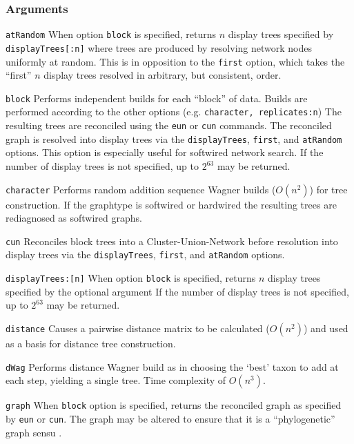 \documentclass[11pt]{article}
\begin{document}
		\subsubsection{Arguments}
		\noindent \texttt{atRandom} When option \texttt{block} is specified, returns $n$ display trees specified by \texttt{displayTrees[:n]} where trees are produced by 
		resolving network nodes uniformly at random.  This is in opposition to the \texttt{first} option, which takes the ``first'' $n$ display trees  resolved in arbitrary, but consistent, order.
		
		\smallskip
		\noindent \texttt{block} Performs independent builds for each ``block'' of data.  Builds are performed according to the other options (e.g. \texttt{character, replicates:n})
		The resulting trees are reconciled using the \texttt{eun} or \texttt{cun} commands.   The reconciled graph is resolved into display trees via the \texttt{displayTrees}, \texttt{first},
		and \texttt{atRandom} options.  This option is especially useful for softwired  network search.  If the number of display trees is not specified, up to  $2^{63}$ may be returned.
		
		\smallskip
		\noindent \texttt{character} Performs random addition sequence Wagner \citep{Farris1970} builds ($O(n^2)$) for tree construction.  If the graphtype is softwired  or hardwired
		the resulting trees are rediagnosed as softwired graphs.
		
		\smallskip
		\noindent \texttt{cun} Reconciles block trees into a  Cluster-Union-Network \citep{Baroni2005} before resolution into display trees via the \texttt{displayTrees}, \texttt{first},
		and \texttt{atRandom} options.
		
		\smallskip
		\noindent \texttt{displayTrees:[n]} When option \texttt{block} is specified, returns $n$ display trees specified by the optional argument  If the number of display trees is not specified, up to  $2^{63}$ may be returned.
	
		\smallskip
		\noindent \texttt{distance} Causes a pairwise distance matrix to be calculated ($O(n^2)$) and used as a basis for distance tree construction.
		
		\smallskip
		\noindent \texttt{dWag} Performs distance Wagner build as in \citep{Farris1972} choosing the `best' taxon to add at each step, 
		yielding a single tree.  Time complexity of $O(n^3)$.
		
		\noindent \texttt{graph} When \texttt{block} option  is specified, returns the reconciled graph as specified by \texttt{eun} or \texttt{cun}.  The graph may be altered to
		ensure that it is a ``phylogenetic'' graph sensu \cite{Moretetal2005}.
		
\end{document}
